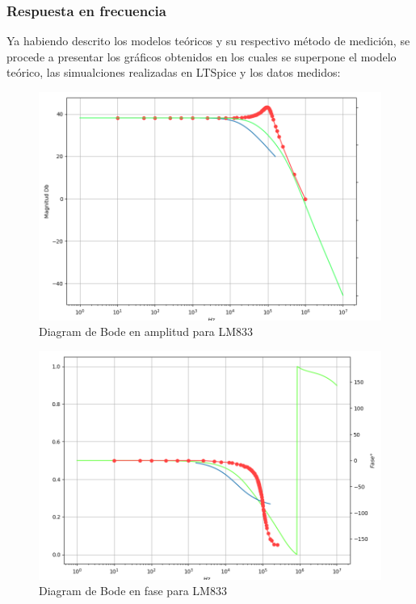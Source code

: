 \subsubsection{Respuesta en frecuencia}

Ya habiendo descrito los modelos teóricos y su respectivo método de medición, se procede a presentar los gráficos obtenidos en los cuales se superpone el modelo teórico, las simualciones realizadas en LTSpice y los datos medidos:



\begin{figure}[H]	
	\centering
	\includegraphics[width=\textwidth]{Ejercicio2/Imagenes/Bode_Amp_LM833.png}
	\caption{Diagram de Bode en amplitud para LM833}
	\label{fig:bode_amp_LM833.}
\end{figure}

\begin{figure}[H]	
	\centering
	\includegraphics[width=\textwidth]{Ejercicio2/Imagenes/Bode_Fase_LM833.png}
	\caption{Diagram de Bode en fase para LM833}
	\label{fig:bode_fase_LM833.}
\end{figure}

